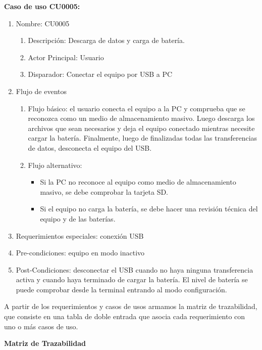 \textbf{Caso de uso CU0005:}

	\begin{enumerate} 
		\item Nombre: CU0005
		\begin{enumerate} [label*=\arabic*.]
			\item Descripción: Descarga de datos y carga de batería.
			\item Actor Principal: Usuario
			\item Disparador: Conectar el equipo por USB a PC
		\end{enumerate}
		\item Flujo de eventos
		\begin{enumerate} [label*=\arabic*.]
			\item Flujo básico: el usuario conecta el equipo a la PC y comprueba que se reconozca como un medio de almacenamiento masivo. Luego descarga los archivos que sean necesarios y deja el equipo conectado mientras necesite cargar la batería. Finalmente, luego de finalizadas todas las transferencias de datos, desconecta el equipo del USB.
			\item Flujo alternativo:
			\begin{itemize}
				\item Si la PC no reconoce al equipo como medio de almacenamiento masivo, se debe comprobar la tarjeta SD.
				\item Si el equipo no carga la batería, se debe hacer una revisión técnica del equipo y de las baterías.			
			\end{itemize}				
		\end{enumerate}

		\item Requerimientos especiales: conexión USB
		\item Pre-condiciones: equipo en modo inactivo
		\item Post-Condiciones: desconectar el USB cuando no haya ninguna transferencia activa y cuando haya terminado de cargar la batería. El nivel de batería se puede comprobar desde la terminal entrando al modo configuración.
	\end{enumerate}
	
A partir de los requerimientos y casos de usos armamos la matriz de trazabilidad, que consiste en una tabla de doble entrada que asocia cada requerimiento con uno o más casos de uso.

\textbf{Matriz de Trazabilidad}


\footnotesize

